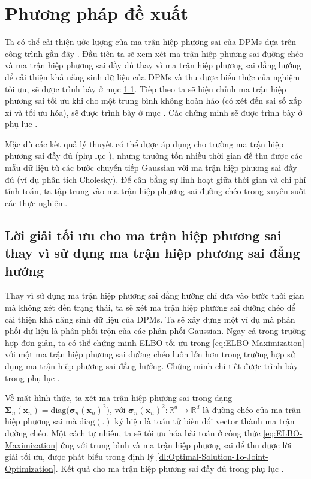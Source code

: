 \documentclass[14pt, a4paper]{article}
\numberwithin{equation}{section}
\numberwithin{figure}{section}
\numberwithin{dl}{section}
\numberwithin{md}{section}
\numberwithin{bd}{section}
\numberwithin{dn}{section}
\numberwithin{hq}{section}
\begin{document}
    \section{Phương pháp đề xuất}

    Ta có thể cải thiện ước lượng của ma trận hiệp phương sai của DPMs dựa trên công trình gần đây \cite{bao2021analytic}.
    Đầu tiên ta sẽ xem xét ma trận hiệp phương sai đường chéo và ma trận hiệp phương sai đầy đủ thay vì ma trận hiệp phương sai đẳng hướng để cải thiện khả năng sinh dữ liệu của DPMs và thu được biểu thức của nghiệm tối ưu,
    sẽ được trình bày ở mục \ref{Optimal-Solution-Covariance-Beyond-Isotropic-Covariance}. Tiếp theo ta sẽ hiệu chỉnh ma trận hiệp phương sai tối ưu khi cho một trung bình không hoàn hảo (có xét đến sai số xấp xỉ và tối ưu hóa), sẽ được trình bày ở mục .
    Các chứng minh sẽ được trình bày ở phụ lục .

    Mặc dù các kết quả lý thuyết có thể được áp dụng cho trường ma trận hiệp phương sai đầy đủ (phụ lục ), 
    nhưng thường tốn nhiều thời gian để thu được các mẫu dữ liệu từ các bước chuyển tiếp Gaussian với ma trận hiệp phương sai đầy đủ (ví dụ phân tích Cholesky).
    Để cân bằng sự linh hoạt giữa thời gian và chi phí tính toán, ta tập trung vào ma trận hiệp phương sai đường chéo trong xuyên suốt các thực nghiệm.

    \subsection{Lời giải tối ưu cho ma trận hiệp phương sai thay vì sử dụng ma trận hiệp phương sai đẳng hướng} \label{Optimal-Solution-Covariance-Beyond-Isotropic-Covariance}

    Thay vì sử dụng ma trận hiệp phương sai đẳng hướng chỉ dựa vào bước thời gian mà không xét đến trạng thái, ta sẽ xét ma trận hiệp phương sai đường chéo để cải thiện khả năng sinh dữ liệu của DPMs.
    Ta sẽ xây dựng một ví dụ mà phân phối dữ liệu là phân phối trộn của các phân phối Gaussian.
    Ngay cả trong trường hợp đơn giản, ta có thể chứng minh ELBO tối ưu trong \ref{eq:ELBO-Maximization} với một ma trận hiệp phương sai đường chéo luôn lớn hơn trong trường hợp sử dụng ma trận hiệp phương sai đẳng hướng.
    Chứng minh chi tiết được trình bày trong phụ lục .

    Về mặt hình thức, ta xét ma trận hiệp phương sai trong dạng $\boldsymbol{\Sigma}_n (\boldsymbol{x}_n)=\mathrm{diag}\big( \boldsymbol{\sigma}_n (\boldsymbol{x}_n)^2 \big)$,
    với $\boldsymbol{\sigma}_n (\boldsymbol{x}_n)^2: \mathbb{R}^d \rightarrow \mathbb{R}^d$ là đường chéo của ma trận hiệp phương sai mà $\mathrm{diag} (.)$ ký hiệu là toán tử biến đổi vector thành ma trận đường chéo.
    Một cách tự nhiên, ta sẽ tối ưu hóa bài toán ở công thức \ref{eq:ELBO-Maximization} ứng với trung bình và ma trận hiệp phương sai để thu được lời giải tối ưu,
    được phát biểu trong định lý \ref{dl:Optimal-Solution-To-Joint-Optimization}. Kết quả cho ma trận hiệp phương sai đầy đủ trong phụ lục .
\end{document}
